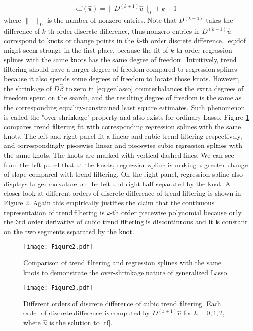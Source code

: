 \documentclass[a4paper]{article}
\begin{document}
\begin{align}
\mbox{df}(\hat{u}) = \|D^{(k+1)}\hat{u}\|_0 + k + 1 \label{eq:dof}
\end{align}
where $\|\cdot\|_0$ is the number of nonzero entries. Note that $D^{(k+1)}$ takes the difference of $k$-th order discrete difference, thus nonzero entries in $D^{(k+1)}\hat{u}$ correspond to knots or change points in the $k$-th order discrete difference. \eqref{eq:dof} might seem strange in the first place, because the fit of $k$-th order regression splines with the same knots has the same degree of freedom. Intuitively, trend filtering should have a larger degree of freedom compared to regression splines because it also spends some degrees of freedom to locate those knots. However, the shrinkage of $D\hat{\beta}$ to zero in \eqref{eq:genlasso} counterbalances the extra degrees of freedom spent on the search, and the resulting degree of freedom is the same as the corresponding equality-constrained least square estimates. Such phenomenon is called the "over-shrinkage" property and also exists for ordinary Lasso. Figure \ref{fig:Figure2_overshrinkage} compares trend filtering fit with corresponding regression splines with the same knots. The left and right panel fit a linear and cubic trend filtering respectively, and correspondingly piecewise linear and piecewise cubic regression splines with the same knots. The knots are marked with vertical dashed lines. We can see from the left panel that at the knots, regression spline is making a greater change of slope compared with trend filtering. On the right panel, regression spline also displays larger curvature on the left and right half separated by the knot. A closer look at different orders of discrete difference of trend filtering is shown in Figure \ref{fig:Figure3_discrete}. Again this empirically justifies the claim that the continuous representation of trend filtering is $k$-th order piecewise polynomial because only the $3$rd order derivative of cubic trend filtering is discontinuous and it is constant on the two segments separated by the knot.  

\begin{figure}[t!]
\centering
\texttt{[image: Figure2.pdf]}
\caption{Comparison of trend filtering and regression splines with the same knots to demonstrate the over-shrinkage nature of generalized Lasso.}
\label{fig:Figure2_overshrinkage}
\end{figure}


\begin{figure}[t!]
\centering
\texttt{[image: Figure3.pdf]}
\caption{Different orders of discrete difference of cubic trend filtering. Each order of discrete difference is computed by $D^{(k+1)}\hat{u}$ for $k=0,1,2$, where $\hat{u}$ is the solution to \eqref{tf}.}
\label{fig:Figure3_discrete}
\end{figure}
\end{document}
